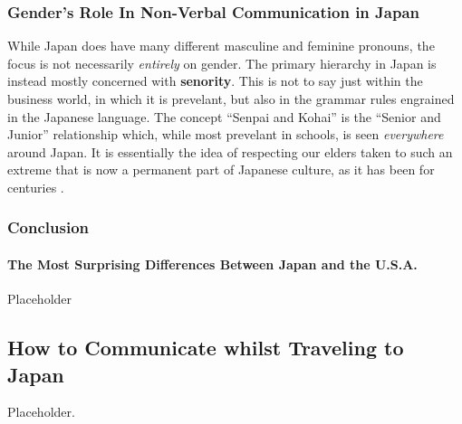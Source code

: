 \documentclass[stu,12pt]{apa7}
\begin{document}
      \subsubsection{Gender's Role In Non-Verbal Communication in Japan}
        While Japan does have many different masculine and feminine pronouns,
          the focus is not necessarily \emph{entirely} on gender. The primary
          hierarchy in Japan is instead mostly concerned with \textbf{senority}.
          This is not to say just within the business world, in which it is
          prevelant, but also in the grammar rules engrained in the Japanese
          language. The concept ``Senpai and Kohai'' is the
          ``Senior and Junior'' relationship which, while most prevelant in
          schools, is seen \textit{everywhere} around Japan. It is essentially
          the idea of respecting our elders taken to such an extreme that is
          now a permanent part of Japanese culture, as it has been for centuries
          \parencite[pp. 253]{potts_japanese_nodate}.
      \subsubsection{Conclusion}
        \paragraph{The Most Surprising Differences Between Japan and the U.S.A.}
          Placeholder

    \subsection{How to Communicate whilst Traveling to Japan}
      Placeholder.





  \newpage
  \nocite{*}
  \printbibliography[%
    title={Additional References},%
    heading={bibintoc},%
    category={consulted}%
  ]
\end{document}
